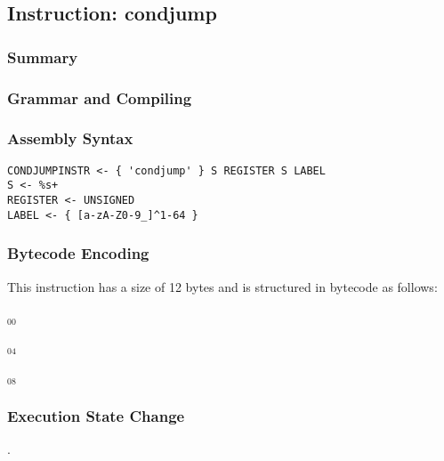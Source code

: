 \subsection{Instruction: condjump}

\subsubsection{Summary}


\subsubsection{Grammar and Compiling}


\subsubsection{Assembly Syntax}

\begin{myquote}
\begin{verbatim}
CONDJUMPINSTR <- { 'condjump' } S REGISTER S LABEL
S <- %s+
REGISTER <- UNSIGNED
LABEL <- { [a-zA-Z0-9_]^1-64 }
\end{verbatim}
\end{myquote}


\subsubsection{Bytecode Encoding}

This instruction has a size of 12 bytes and is structured in bytecode as follows:

$_{00}$\ 



$_{04}$\ 



$_{08}$\ 
\fbox{%
  \parbox{20pt}{%
00
  }%
}


\subsubsection{Execution State Change}

.


